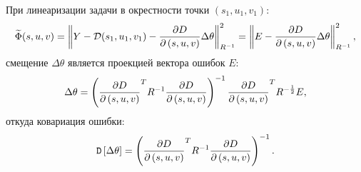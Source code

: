 При линеаризации задачи в окрестности точки $(s_1, u_1, v_1)$:
\[
    \widetilde{\Phi}(s,u,v)
    = \left \| Y - \mathcal{D}(s_1,u_1,v_1) - \frac{\partial D}{\partial \left( s,u,v \right)} \Delta \theta \right \|_{R^{-1}}^2
    = \left \| E - \frac{\partial D}{\partial \left( s,u,v \right)} \Delta \theta \right \|_{R^{-1}}^2 ,
\]
смещение $\Delta \theta$ является проекцией вектора ошибок $E$:
\[
    \Delta \theta = \left( \frac{\partial D}{\partial \left( s,u,v \right)}^T R^{-1}\frac{\partial D}{\partial \left( s,u,v \right)} \right)^{-1} \frac{\partial D}{\partial \left( s,u,v \right)}^T R^{-\frac{1}{2}} E ,
\]
откуда ковариация ошибки:
\[
    \mathtt{D} \left[ \Delta \theta \right] = \left( \frac{\partial D}{\partial \left( s,u,v \right)}^T R^{-1}\frac{\partial D}{\partial \left( s,u,v \right)} \right)^{-1} .
\]
